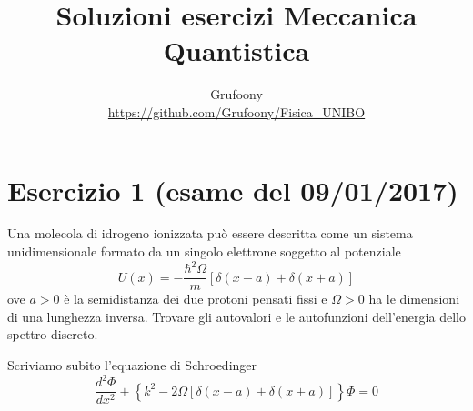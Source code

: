 \documentclass[a4paper]{article}
\begin{document}
	\title{Soluzioni esercizi Meccanica Quantistica}
	\author{Grufoony\\\url{https://github.com/Grufoony/Fisica_UNIBO}}
	\maketitle

    \section*{Esercizio 1 (esame del 09/01/2017)}
        Una molecola di idrogeno ionizzata può essere descritta come un sistema unidimensionale formato da un singolo elettrone soggetto al potenziale
        \begin{equation*}
            U(x)=-\frac{\hbar^2\Omega}{m}\left[\delta(x-a)+\delta(x+a)\right]
        \end{equation*}
        ove $a>0$ è la semidistanza dei due protoni pensati fissi e $\Omega>0$ ha le dimensioni di una lunghezza inversa.
        Trovare gli autovalori e le autofunzioni dell'energia dello spettro discreto.
        \begin{figure}[H]
            \centering
        \end{figure}
        Scriviamo subito l'equazione di Schroedinger
        \begin{equation*}
            \frac{d^2\Phi}{dx^2}+\left\{k^2-2\Omega\left[\delta(x-a)+\delta(x+a)\right]\right\}\Phi=0
        \end{equation*}
\end{document}
